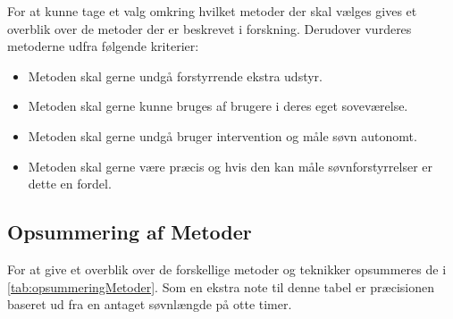 For at kunne tage et valg omkring hvilket metoder der skal vælges gives et overblik over de metoder der er beskrevet i forskning. Derudover vurderes metoderne udfra følgende kriterier:
\begin{itemize}
\item Metoden skal gerne undgå forstyrrende ekstra udstyr.
\item Metoden skal gerne kunne bruges af brugere i deres eget soveværelse.
\item Metoden skal gerne undgå bruger intervention og måle søvn autonomt.
\item Metoden skal gerne være præcis og hvis den kan måle søvnforstyrrelser er dette en fordel.
\end{itemize}

\subsection{Opsummering af Metoder}
For at give et overblik over de forskellige metoder og teknikker opsummeres de i \cref{tab:opsummeringMetoder}.
Som en ekstra note til denne tabel er præcisionen baseret ud fra en antaget søvnlængde på otte timer. 

